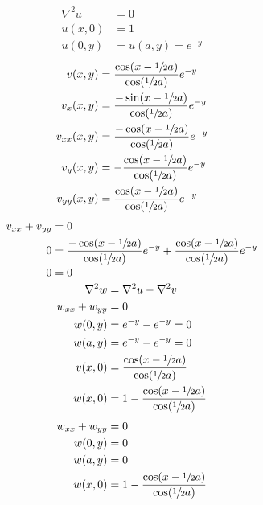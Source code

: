 \documentclass[../../HW08.tex]{subfiles}
\begin{document}
\begin{align*}
    \nabla^{2} u & = 0               \\
    u(x,0)       & = 1               \\
    u(0,y)       & = u(a,y) = e^{-y}
\end{align*}
\begin{align*}
    v(x,y)      & = \frac{\cos(x - \sfrac{1}{2}a)}{\cos(\sfrac{1}{2}a)}e^{-y}  \\
    v_{x}(x,y)  & = \frac{-\sin(x - \sfrac{1}{2}a)}{\cos(\sfrac{1}{2}a)}e^{-y} \\
    v_{xx}(x,y) & = \frac{-\cos(x - \sfrac{1}{2}a)}{\cos(\sfrac{1}{2}a)}e^{-y} \\
    v_{y}(x,y)  & = -\frac{\cos(x - \sfrac{1}{2}a)}{\cos(\sfrac{1}{2}a)}e^{-y} \\
    v_{yy}(x,y) & = \frac{\cos(x - \sfrac{1}{2}a)}{\cos(\sfrac{1}{2}a)}e^{-y}  \\
\end{align*}
\begin{align*}
    v_{xx}+v_{yy} & = 0                                                                                                                      \\
    0             & = \frac{-\cos(x - \sfrac{1}{2}a)}{\cos(\sfrac{1}{2}a)}e^{-y} + \frac{\cos(x - \sfrac{1}{2}a)}{\cos(\sfrac{1}{2}a)}e^{-y} \\
    0             & = 0
\end{align*}
\begin{align*}
    \nabla^{2}w     & = \nabla^{2}u - \nabla^{2}v                             \\
    w_{xx} + w_{yy} & = 0                                                     \\
    w(0,y)          & = e^{-y} - e^{-y} = 0                                   \\
    w(a,y)          & = e^{-y} - e^{-y} = 0                                   \\
    v(x,0)          & = \frac{\cos(x-\sfrac{1}{2}a)}{\cos(\sfrac{1}{2}a)}     \\
    w(x,0)          & = 1 - \frac{\cos(x-\sfrac{1}{2}a)}{\cos(\sfrac{1}{2}a)}
\end{align*}
\begin{align*}
    w_{xx} + w_{yy} & = 0                                                     \\
    w(0,y)          & = 0                                                     \\
    w(a,y)          & = 0                                                     \\
    w(x,0)          & = 1 - \frac{\cos(x-\sfrac{1}{2}a)}{\cos(\sfrac{1}{2}a)}
\end{align*}
\end{document}
